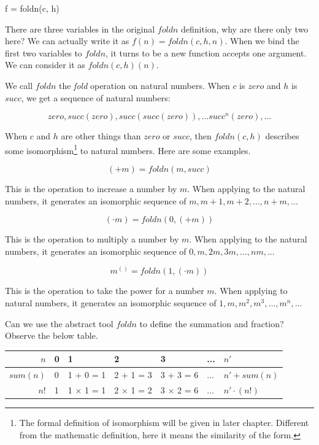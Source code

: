 \documentclass[UTF8]{article}
\begin{document}
\be
f = foldn(c, h)
\ee

There are three variables in the original $foldn$ definition, why are there only two here? We can actually write it as $f(n) = foldn(c, h, n)$. When we bind the first two variables to $foldn$, it turns to be a new function accepts one argument. We can consider it as $foldn(c, h)(n)$.

We call $foldn$ the {\em fold} operation on natural numbers. When $c$ is $zero$ and $h$ is $succ$, we get a sequence of natural numbers:

\[
zero, succ(zero), succ(succ(zero)), ... succ^n(zero), ...
\]

When $c$ and $h$ are other things than $zero$ or $succ$, then $foldn(c, h)$ describes some isomorphism\footnote{The formal definition of isomorphism will be given in later chapter. Different from the mathematic definition, here it means the similarity of the form.} to natural numbers. Here are some examples.

\[
(+ m) = foldn(m, succ)
\]

This is the operation to increase a number by $m$. When applying to the natural numbers, it generates an isomorphic sequence of $m, m + 1, m + 2, ..., n + m, ...$

\[
(\cdot m) = foldn(0, (+ m))
\]

This is the operation to multiply a number by $m$. When applying to the natural numbers, it generates an isomorphic sequence of $0, m, 2m, 3m, ..., nm, ...$

\[
m^{()} = foldn(1, (\cdot m))
\]

This is the operation to take the power for a number $m$. When applying to natural numbers, it generates an isomorphic sequence of $1, m, m^2, m^3, ..., m^n, ...$

Can we use the abstract tool $foldn$ to define the summation and fraction? Observe the below table.

\vspace{5mm}

\begin{tabular}{r|l|l|l|l|l|l}
$n$ & 0 & 1 & 2 & 3 & ... & $n'$ \\
\hline
$sum(n)$ & 0 & 1 + 0 = 1 & 2 + 1 = 3 & 3 + 3 = 6 & ... & $n' + sum(n)$ \\
\hline
$n!$ & 1 & 1 $\times$ 1 = 1 & 2 $\times$ 1 = 2 & 3 $\times$ 2 = 6 & ... & $n' \cdot (n!)$
\end{tabular}

\vspace{5mm}
\end{document}
